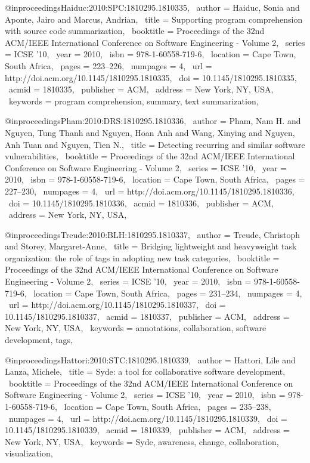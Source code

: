 @inproceedings{Haiduc:2010:SPC:1810295.1810335,
 author = {Haiduc, Sonia and Aponte, Jairo and Marcus, Andrian},
 title = {Supporting program comprehension with source code summarization},
 booktitle = {Proceedings of the 32nd ACM/IEEE International Conference on Software Engineering - Volume 2},
 series = {ICSE '10},
 year = {2010},
 isbn = {978-1-60558-719-6},
 location = {Cape Town, South Africa},
 pages = {223--226},
 numpages = {4},
 url = {http://doi.acm.org/10.1145/1810295.1810335},
 doi = {10.1145/1810295.1810335},
 acmid = {1810335},
 publisher = {ACM},
 address = {New York, NY, USA},
 keywords = {program comprehension, summary, text summarization},
} 

@inproceedings{Pham:2010:DRS:1810295.1810336,
 author = {Pham, Nam H. and Nguyen, Tung Thanh and Nguyen, Hoan Anh and Wang, Xinying and Nguyen, Anh Tuan and Nguyen, Tien N.},
 title = {Detecting recurring and similar software vulnerabilities},
 booktitle = {Proceedings of the 32nd ACM/IEEE International Conference on Software Engineering - Volume 2},
 series = {ICSE '10},
 year = {2010},
 isbn = {978-1-60558-719-6},
 location = {Cape Town, South Africa},
 pages = {227--230},
 numpages = {4},
 url = {http://doi.acm.org/10.1145/1810295.1810336},
 doi = {10.1145/1810295.1810336},
 acmid = {1810336},
 publisher = {ACM},
 address = {New York, NY, USA},
} 

@inproceedings{Treude:2010:BLH:1810295.1810337,
 author = {Treude, Christoph and Storey, Margaret-Anne},
 title = {Bridging lightweight and heavyweight task organization: the role of tags in adopting new task categories},
 booktitle = {Proceedings of the 32nd ACM/IEEE International Conference on Software Engineering - Volume 2},
 series = {ICSE '10},
 year = {2010},
 isbn = {978-1-60558-719-6},
 location = {Cape Town, South Africa},
 pages = {231--234},
 numpages = {4},
 url = {http://doi.acm.org/10.1145/1810295.1810337},
 doi = {10.1145/1810295.1810337},
 acmid = {1810337},
 publisher = {ACM},
 address = {New York, NY, USA},
 keywords = {annotations, collaboration, software development, tags},
} 

@inproceedings{Hattori:2010:STC:1810295.1810339,
 author = {Hattori, Lile and Lanza, Michele},
 title = {Syde: a tool for collaborative software development},
 booktitle = {Proceedings of the 32nd ACM/IEEE International Conference on Software Engineering - Volume 2},
 series = {ICSE '10},
 year = {2010},
 isbn = {978-1-60558-719-6},
 location = {Cape Town, South Africa},
 pages = {235--238},
 numpages = {4},
 url = {http://doi.acm.org/10.1145/1810295.1810339},
 doi = {10.1145/1810295.1810339},
 acmid = {1810339},
 publisher = {ACM},
 address = {New York, NY, USA},
 keywords = {Syde, awareness, change, collaboration, visualization},
} 

